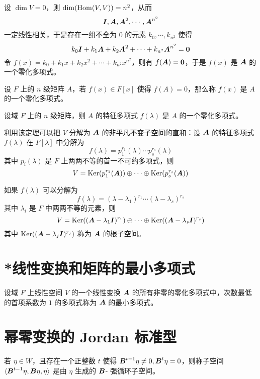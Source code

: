 设 $\dim V = 0$，则 $\dim(\operatorname{Hom}(V,V)) = n^2$，从而
\[ \boldsymbol{I}, \boldsymbol{A}, \boldsymbol{A}^2, \cdots, \boldsymbol{A}^{n^2} \]
一定线性相关，于是存在一组不全为 $0$ 的元素 $k_0,\cdots,k_{n^2}$ 使得
\[ k_0\boldsymbol{I} + k_1\boldsymbol{A} + k_2\boldsymbol{A}^2 + \cdots + k_{n^2}\boldsymbol{A}^{n^2} = \boldsymbol{0} \]
令 $f(x) = k_0 + k_1x + k_2x^2 + \cdots + k_{n^2}x^{n^2}$，则有 $f(\boldsymbol{A}) = \boldsymbol{0}$，于是 $f(x)$ 是 $\boldsymbol{A}$ 的一个零化多项式。

\begin{definition}
    设 $F$ 上的 $n$ 级矩阵 $A$，若 $f(x) \in F[x]$ 使得 $f(A) = 0$，那么称 $f(x)$ 是 $A$ 的一个零化多项式。
\end{definition}

\begin{theorem}
    设域 $F$ 上的 $n$ 级矩阵，则 $A$ 的特征多项式 $f(\lambda)$ 是 $A$ 的一个零化多项式。
\end{theorem}

利用该定理可以把 $V$ 分解为 $\boldsymbol{A}$ 的非平凡不变子空间的直和：设 $\boldsymbol{A}$ 的特征多项式 $f(\lambda)$ 在 $F[\lambda]$ 中分解为
\[ f(\lambda) = p_1^{r_1}(\lambda) \cdots p_s^{r_s}(\lambda) \]
其中 $p_i(\lambda)$ 是 $F$ 上两两不等的首一不可约多项式，则
\[ V = \operatorname{Ker}(p_1^{r_1}(\boldsymbol{A})) \oplus \cdots \oplus \operatorname{Ker}(p_s^{r_s}(\boldsymbol{A})) \]

如果 $f(\lambda)$ 可以分解为
\[ f(\lambda) = (\lambda - \lambda_1)^{r_1} \cdots (\lambda - \lambda_s)^{r_s} \]
其中 $\lambda_i$ 是 $F$ 中两两不等的元素，则
\[ V = \operatorname{Ker}((\boldsymbol{A} - \lambda_1\boldsymbol{I})^{r_1}) \oplus \cdots \oplus \operatorname{Ker}((\boldsymbol{A} - \lambda_s\boldsymbol{I})^{r_s}) \]
其中 $\operatorname{Ker}((\boldsymbol{A} - \lambda_j\boldsymbol{I})^{r_j})$ 称为 $\boldsymbol{A}$ 的根子空间。

\section{*线性变换和矩阵的最小多项式}

\begin{definition}[最小多项式] 
    设域 $F$ 上线性空间 $V$ 的一个线性变换 $\boldsymbol{A}$ 的所有非零的零化多项式中，次数最低的首项系数为 $1$ 的多项式称为 $\boldsymbol{A}$ 的最小多项式。
\end{definition}

\section{幂零变换的 Jordan 标准型}

\begin{definition}
    若 $\eta \in W$，且存在一个正整数 $t$ 使得 $\boldsymbol{B}^{t-1}\eta \ne 0, \boldsymbol{B}^t\eta = 0$，则称子空间 $\langle \boldsymbol{B}^{t-1}\eta,\boldsymbol{B}\eta,\eta \rangle$ 是由 $\eta$ 生成的 $\boldsymbol{B}$- 强循环子空间。 
\end{definition}

